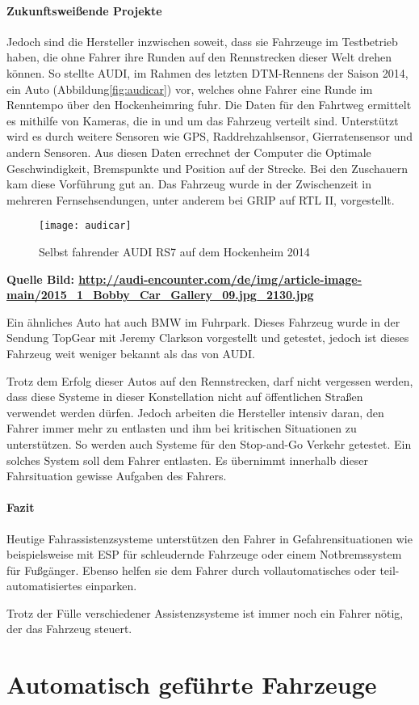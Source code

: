 \paragraph{Zukunftsweißende Projekte} Jedoch sind die Hersteller inzwischen soweit, dass sie Fahrzeuge im Testbetrieb haben, die ohne Fahrer ihre Runden auf den Rennstrecken dieser Welt drehen können. So stellte AUDI, im Rahmen des letzten DTM-Rennens der Saison 2014, ein Auto (Abbildung\vref{fig:audicar}) vor, welches ohne Fahrer eine Runde im Renntempo über den Hockenheimring fuhr. Die Daten für den Fahrtweg ermittelt es mithilfe von Kameras, die in und um das Fahrzeug verteilt sind. Unterstützt wird es durch weitere Sensoren wie GPS, Raddrehzahlsensor, Gierratensensor und andern Sensoren. Aus diesen Daten errechnet der Computer die Optimale Geschwindigkeit, Bremspunkte und Position auf der Strecke. Bei den Zuschauern kam diese Vorführung gut an. Das Fahrzeug wurde in der Zwischenzeit in mehreren Fernsehsendungen, unter anderem bei GRIP auf RTL II, vorgestellt. 
\begin{figure}[htb]
\centering
\texttt{[image: audicar]}
\caption{Selbst fahrender AUDI RS7 auf dem Hockenheim 2014 }
\label{fig:audicar}
\end{figure}
\textbf{Quelle Bild: \url{ http://audi-encounter.com/de/img/article-image-main/2015_1_Bobby_Car_Gallery_09.jpg_2130.jpg}}


Ein ähnliches Auto hat auch BMW im Fuhrpark. Dieses Fahrzeug wurde in der Sendung TopGear mit Jeremy Clarkson vorgestellt und getestet, jedoch ist dieses Fahrzeug weit weniger bekannt als das von AUDI.

Trotz dem Erfolg dieser Autos auf den Rennstrecken, darf nicht vergessen werden, dass diese Systeme in dieser Konstellation nicht auf öffentlichen Straßen verwendet werden dürfen. Jedoch arbeiten die Hersteller intensiv daran, den Fahrer immer mehr zu entlasten und ihm bei kritischen Situationen zu unterstützen. So werden auch Systeme für den Stop-and-Go Verkehr getestet. Ein solches System soll dem Fahrer entlasten. Es übernimmt innerhalb dieser Fahrsituation gewisse Aufgaben des Fahrers.

\paragraph{Fazit} Heutige Fahrassistenzsysteme unterstützen den Fahrer in Gefahrensituationen wie beispielsweise mit ESP für schleudernde Fahrzeuge oder einem Notbremssystem für Fußgänger. Ebenso helfen sie dem Fahrer durch vollautomatisches oder teil-automatisiertes einparken. 

Trotz der Fülle verschiedener Assistenzsysteme ist  immer noch ein Fahrer nötig, der das Fahrzeug steuert. 




\section{Automatisch geführte Fahrzeuge}
